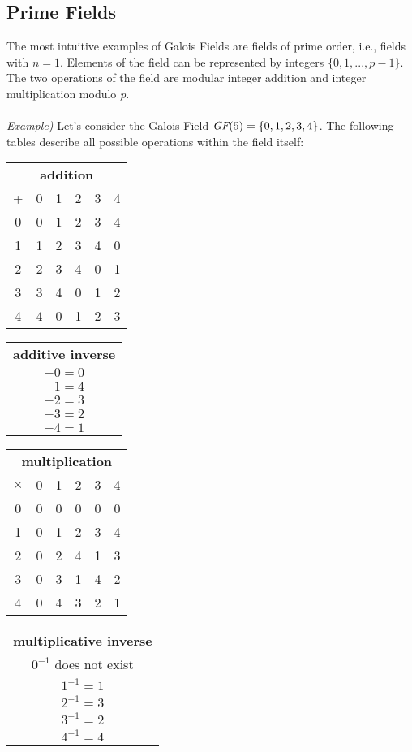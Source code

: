 \subsection{Prime Fields}
The most intuitive examples of Galois Fields are fields of prime order, i.e., fields with $n=1$. Elements of the field  can be represented by integers $\{0,1,...,p-1\}$. The two operations of the field are modular integer addition and integer multiplication modulo \textit{p}.\\\\
\textit{Example)} Let's consider the Galois Field $\textit{GF}(5)=\{0,1,2,3,4\}$. The following tables describe all possible operations within the field itself:
\begin{center}
    \begin{tabular}{c|ccccc}
         \multicolumn{6}{c}{\textbf{addition}}\\
         +&0&1&2&3&4\\
         \hline
         0&0&1&2&3&4\\
         1&1&2&3&4&0\\
         2&2&3&4&0&1\\
         3&3&4&0&1&2\\
         4&4&0&1&2&3
    \end{tabular}\qquad
    \begin{tabular}{c}
         \textbf{additive inverse}\\
         $-0=0$\\
         $-1=4$\\
         $-2=3$\\
         $-3=2$\\
         $-4=1$
    \end{tabular}\qquad
    \begin{tabular}{c|ccccc}
         \multicolumn{6}{c}{\textbf{multiplication}}\\
         $\times$&0&1&2&3&4\\
         \hline
         0&0&0&0&0&0\\
         1&0&1&2&3&4\\
         2&0&2&4&1&3\\
         3&0&3&1&4&2\\
         4&0&4&3&2&1
    \end{tabular}\qquad
    \begin{tabular}{c}
         \textbf{multiplicative inverse}\\
         $0^{-1}$ does not exist\\
         $1^{-1}=1$\\
         $2^{-1}=3$\\
         $3^{-1}=2$\\
         $4^{-1}=4$
    \end{tabular}
\end{center}
